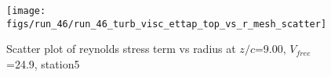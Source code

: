\begin{figure}[H]
\centering
\texttt{[image: figs/run\_46/run\_46\_turb\_visc\_ettap\_top\_vs\_r\_mesh\_scatter]}
\caption{Scatter plot of reynolds stress term vs radius at $z/c$=9.00, $V_{free}$=24.9, station5}
\label{fig:run_46_turb_visc_ettap_top_vs_r_mesh_scatter}
\end{figure}


